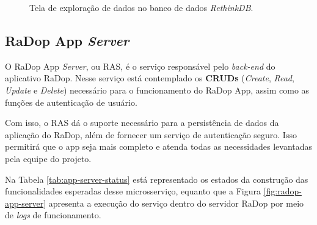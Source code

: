 \begin{figure}[!h]
	\caption{\label{fig:explorer-rethinkdb} Tela de exploração de dados no banco de dados \textit{RethinkDB}.}
\end{figure}

\subsection{RaDop App \textit{Server}}

O RaDop App \textit{Server}, ou RAS, é o serviço responsável pelo \textit{back-end} do aplicativo RaDop. Nesse serviço está contemplado os \textbf{CRUDs} (\textit{Create}, \textit{Read}, \textit{Update} e \textit{Delete}) necessário para o funcionamento do RaDop App, assim como as funções de autenticação de usuário.

Com isso, o RAS dá o suporte necessário para a persistência de dados da aplicação do RaDop, além de fornecer um serviço de autenticação seguro. Isso permitirá que o app seja mais completo e atenda todas as necessidades levantadas pela equipe do projeto.

Na Tabela \ref{tab:app-server-status} está representado os estados da construção das funcionalidades esperadas desse microsserviço, equanto que a Figura \ref{fig:radop-app-server} apresenta a execução do serviço dentro do servidor RaDop por meio de \textit{logs} de funcionamento.\newpage

